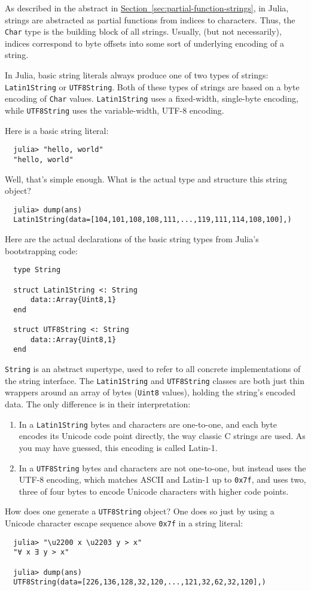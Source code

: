 \documentclass{article}
\newcommand{\Section}[1]{\hyperref[sec:#1]{Section~\ref*{sec:#1}}}
\begin{document}
As described in the abstract in \Section{partial-function-strings}, in Julia, strings are abstracted as partial functions from indices to characters.
Thus, the \verb|Char| type is the building block of all strings.
Usually, (but not necessarily), indices correspond to byte offsets into some sort of underlying encoding of a string.

In Julia, basic string literals always produce one of two types of strings:
\verb|Latin1String| or \verb|UTF8String|.
Both of these types of strings are based on a byte encoding of \verb|Char| values.
\verb|Latin1String| uses a fixed-width, single-byte encoding, while \verb|UTF8String| uses the variable-width, UTF-8 encoding.

Here is a basic string literal:
\begin{verbatim}
  julia> "hello, world"
  "hello, world"
\end{verbatim}
Well, that's simple enough.
What is the actual type and structure this string object?
\begin{verbatim}
  julia> dump(ans)
  Latin1String(data=[104,101,108,108,111,...,119,111,114,108,100],)
\end{verbatim}
Here are the actual declarations of the basic string types from Julia's bootstrapping code:
\begin{verbatim}
  type String

  struct Latin1String <: String
      data::Array{Uint8,1}
  end

  struct UTF8String <: String
      data::Array{Uint8,1}
  end
\end{verbatim}
\verb|String| is an abstract supertype, used to refer to all concrete implementations of the string interface.
The \verb|Latin1String| and \verb|UTF8String| classes are both just thin wrappers around an array of bytes (\verb|Uint8| values), holding the string's encoded data.
The only difference is in their interpretation:
\begin{enumerate}
\item In a \verb|Latin1String| bytes and characters are one-to-one, and each byte encodes its Unicode code point directly, the way classic C strings are used.
As you may have guessed, this encoding is called Latin-1.
\item In a \verb|UTF8String| bytes and characters are not one-to-one, but instead uses the UTF-8 encoding, which matches ASCII and Latin-1 up to \verb|0x7f|, and uses two, three of four bytes to encode Unicode characters with higher code points.
\end{enumerate}
How does one generate a \verb|UTF8String| object?
One does so just by using a Unicode character escape sequence above \verb|0x7f| in a string literal:
\begin{verbatim}
  julia> "\u2200 x \u2203 y > x"
  "∀ x ∃ y > x"

  julia> dump(ans)
  UTF8String(data=[226,136,128,32,120,...,121,32,62,32,120],)
\end{verbatim}
\end{document}
